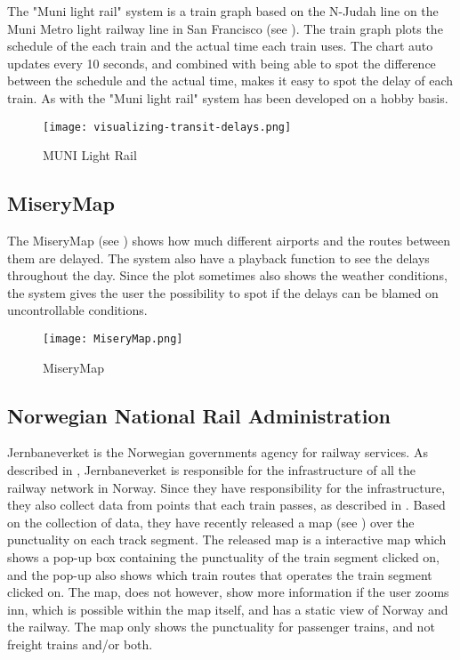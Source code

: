 The "Muni light rail" system is a train graph based on the N-Judah line on the 
Muni Metro light railway line in San Francisco (see ). 
The train graph plots the schedule of the each train and the actual time each 
train uses. The chart auto updates every 10 seconds, and combined with being 
able to spot the difference between the schedule and the actual time, makes it 
easy to spot the delay of each train. As with 
the "Muni light rail" system has been developed on a hobby basis.

\begin{figure}[!htbp]
	\texttt{[image: visualizing-transit-delays.png]}
	\caption[MUNI Light Rail]{MUNI Light Rail \cite{muniLightRail}}
	\label{fig:muniLightRail}
\end{figure}

\subsection{MiseryMap}
\label{sub:subsection_zugmonitor}

The MiseryMap (see ) shows how much different airports and 
the routes between them are delayed. The system also have a playback function 
to see the delays throughout the day. Since the plot sometimes also shows the 
weather conditions, the system gives the user the possibility to spot if the 
delays can be blamed on uncontrollable conditions. 

\begin{figure}[!htbp]
	\texttt{[image: MiseryMap.png]}
	\caption[MiseryMap]{MiseryMap \cite{flightAware:MiseryMap}}
	\label{fig:miserymap}
\end{figure}
 
\subsection{Norwegian National Rail Administration}
\label{sub:subsection_jernbaneverket}

Jernbaneverket is the Norwegian governments agency for railway services. As described in , 
Jernbaneverket is responsible for the infrastructure of all the railway 
network in Norway. Since they have responsibility for the infrastructure, 
they also collect data from points that each train passes, as described in 
. Based on the collection of data, they have recently 
released a map (see ) over the punctuality 
on each track segment. The released map is a interactive map which shows a 
pop-up box containing the punctuality of the train segment clicked on, and the 
pop-up also shows which train routes that operates the train segment clicked 
on. The map, does not however, show more information if the user zooms inn, 
which is possible within the map itself, and has a static view of Norway and 
the railway. The map only shows the punctuality for passenger trains, and not 
freight trains and/or both.\\ 

